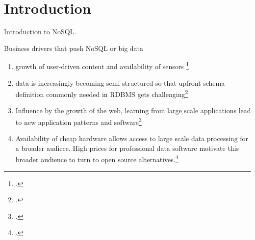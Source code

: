 \newpage

\listoftables
{}
\newpage



\listoflistings
{}
\newpage

\renewcommand{\thepage}{\arabic{page}}

\setcounter{page}{1} 


\section{Introduction}
\label{sec:introduction}

Introduction to NoSQL.

Business drivers that push NoSQL or big data
\begin{enumerate}
  \item growth of user-driven content and availability of sensors
  \footcite[Cf.][XVII]{Tiwari_2011}
  \item data is increasingly becoming semi-structured so that upfront schema
  definition commonly needed in RDBMS gets
  challenging\footcite[Cf.][XVII]{Tiwari_2011}
  \item Influence by the growth of the web, learning from large scale
  applications lead to new application patterns and
  software\footcite[Cf.][VII]{Warden_2011}
  \item Availability of cheap hardware allows access to large scale data
  processing for a broader audiece. High prices for professional data software
  motivate this broader audience to turn to open source
  alternatives.\footcite[Cf.][VII]{Warden_2011}
\end{enumerate}

